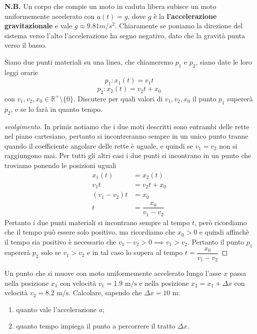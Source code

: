 \documentclass{rapport}
\begin{document}
\textbf{N.B.} Un corpo che compie un moto in caduta libera subisce un moto uniformemente accelerato con $a(t)=g$, dove $g$ è la \textbf{l'accelerazione gravitazionale} e vale $g\approx 9.81m/s^2$. Chiaramente se poniamo la direzione del sistema verso l'alto l'accelerazione ha segno negativo, dato che la gravità punta verso il basso.

\begin{esercizio}{}{}
  Siano due punti materiali su una linea, che chiameremo $p_1$ e $p_2$, siano date le loro leggi orarie
  \[
  p_1 : x_1(t) = v_1t  
  \]\[
  p_2 : x_2(t) = v_2t  + x_0
  \] 
  con $v_1, v_2, x_0 \in \mathbb{R}^+ \setminus \{0\}$. Discutere per quali valori di $v_1, v_2, x_0$ il punto $p_1$ supererà $p_2$, e se lo farà in quanto tempo.
\end{esercizio}
\begin{proof}[svolgimento]
  In primis notiamo che i due moti descritti sono entrambi delle rette nel piano cartesiano, pertanto si incontreranno sempre in un unico punto tranne quando il coefficiente angolare delle rette è uguale, e  quindi se $v_1 = v_2$ non si raggiungono mai. Per tutti gli altri casi i due punti si incontrano in un punto che troviamo ponendo le posizioni uguali
  \begin{align*}
    x_1(t) &= x_2(t) \\
    v_1t&= v_2t  + x_0 \\
    (v_1-v_2)t &= x_0 \\
    t &= \dfrac{x_0}{v_1-v_2}
  \end{align*}
  Pertanto i due punti materiali si incontrano sempre al tempo $t$, però ricordiamo che il tempo può essere solo positivo, ma ricordiamo che $x_0 >0$ e quindi affinchè il tempo sia positivo è necessario che $v_1 -v_2 > 0 \implies v_1 > v_2$. Pertanto il punto $p_1$ supererà $p_2$ solo se $v_1 > v_2$ e in tal caso lo supera al tempo $t=\dfrac{x_0}{v_1-v_2}$
\end{proof}

\begin{esercizio}{}{}
  Un punto che si muove con moto uniformemente accelerato lungo l'asse $x$ passa nella posizione $x_1$ con velocità $v_1 = 1.9 \text{ m/s}$ e nella posizione $x_2 = x_1 + \Delta x$ con velocità $v_2 = 8.2 \text{ m/s}$. Calcolare, sapendo che $\Delta x = 10 \text{ m}$:
\begin{enumerate}
    \item quanto vale l'accelerazione $a$;
    \item quanto tempo impiega il punto a percorrere il tratto $\Delta x$.
\end{enumerate}
\end{esercizio}
\end{document}
